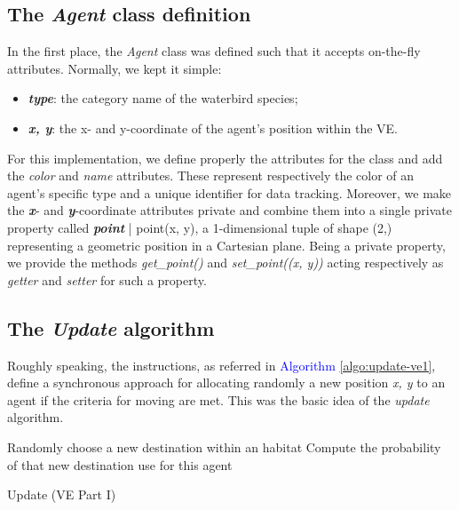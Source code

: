 \subsection{The \emph{Agent} class definition}
In the first place, the \emph{Agent} class was defined such that it accepts on-the-fly attributes. Normally, we kept it simple:
\begin{itemize}
    \item \textbf{\textit{type}}: the category name of the waterbird species;
    \item \textbf{\textit{x, y}}: the x- and y-coordinate of the agent's position within the VE.
\end{itemize}
For this implementation, we define properly the attributes for the class and add the \emph{color} and \emph{name} attributes. These represent respectively the color of an agent's specific type and a unique identifier for data tracking. Moreover, we make the \textbf{\textit{x}}- and \textbf{\textit{y}}-coordinate attributes private and combine them into a single private property called \textbf{\textit{point}} | point(x, y), a 1-dimensional tuple of shape (2,) representing a geometric position in a Cartesian plane. Being a private property, we provide the methods \emph{get\_point()} and \emph{set\_point((x, y))} acting respectively as \emph{getter} and \emph{setter} for such a property.

\subsection{The \emph{Update} algorithm}
Roughly speaking, the instructions, as referred in \textcolor{blue}{Algorithm} \ref{algo:update-ve1}, define a synchronous approach for allocating randomly a new position \emph{x, y} to an agent if the criteria for moving are met. This was the basic idea of the \emph{update} algorithm.

\vspace{0.4cm}
\begin{algorithm}[H]
    \SetAlgoLined
    Randomly choose a new destination within an  habitat\;
    Compute the probability of that new destination use for this agent \;
    \caption{Update (VE Part I)}
    \label{algo:update-ve1}
\end{algorithm}
\vspace{0.4cm}

